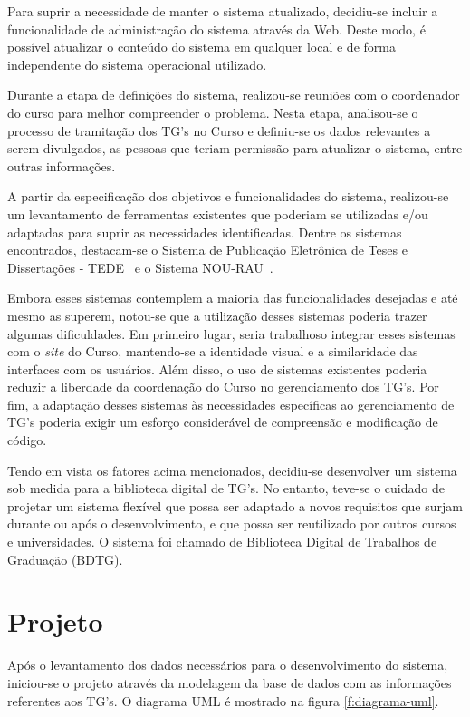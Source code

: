 \documentclass[12pt]{article}
\newcommand{\site}{\textit{site}\xspace}
\begin{document}
Para suprir a necessidade de manter o sistema atualizado, decidiu-se incluir a funcionalidade de administra\c{c}\~{a}o do sistema atrav\'{e}s da Web. Deste modo, \'{e} poss\'{i}vel atualizar o conte\'{u}do do sistema em qualquer local e de forma independente do sistema operacional utilizado.

Durante a etapa de defini\c{c}\~{o}es do sistema, realizou-se reuni\~{o}es com o coordenador do curso para melhor compreender o problema. Nesta etapa, analisou-se o processo de tramita\c{c}\~{a}o dos TG's no Curso e definiu-se os dados relevantes a serem divulgados, as pessoas que teriam permiss\~{a}o para atualizar o sistema, entre outras informa\c{c}\~{o}es.

A partir da especifica\c{c}\~{a}o dos objetivos e funcionalidades do sistema, realizou-se um levantamento de ferramentas existentes que poderiam se utilizadas e/ou adaptadas para suprir as necessidades identificadas. Dentre os sistemas encontrados, destacam-se o Sistema de Publica\c{c}\~{a}o Eletr\^{o}nica de Teses e Disserta\c{c}\~{o}es - TEDE~\cite{tede} e o Sistema NOU-RAU~\cite{nourau}.

Embora esses sistemas contemplem a maioria das funcionalidades desejadas e at\'{e} mesmo as superem, notou-se que a utiliza\c{c}\~{a}o desses sistemas poderia trazer algumas dificuldades. Em primeiro lugar, seria trabalhoso integrar esses sistemas com o \site do Curso, mantendo-se a identidade visual e a similaridade das interfaces com os usu\'{a}rios. Al\'{e}m disso, o uso de sistemas existentes poderia reduzir a liberdade da coordena\c{c}\~{a}o do Curso no gerenciamento dos TG's. Por fim, a adapta\c{c}\~{a}o desses sistemas \`{a}s necessidades espec\'{i}ficas ao gerenciamento de TG's poderia exigir um esfor\c{c}o consider\'{a}vel de compreens\~{a}o e modifica\c{c}\~{a}o de c\'{o}digo.

Tendo em vista os fatores acima mencionados, decidiu-se desenvolver um sistema sob medida para a biblioteca digital de TG's. No entanto, teve-se o cuidado de projetar um sistema flex\'{i}vel que possa ser adaptado a novos requisitos que surjam durante ou ap\'{o}s o desenvolvimento, e que possa ser reutilizado por outros cursos e universidades. O sistema foi chamado de Biblioteca Digital de Trabalhos de Gradua\c{c}\~{a}o (BDTG).


\section{Projeto}
Ap\'{o}s o levantamento dos dados necess\'{a}rios para o desenvolvimento do sistema, iniciou-se o projeto atrav\'{e}s da modelagem da base de dados com as informa\c{c}\~{o}es referentes aos TG's. O diagrama UML \'{e} mostrado na figura \ref{f:diagrama-uml}.
\end{document}
